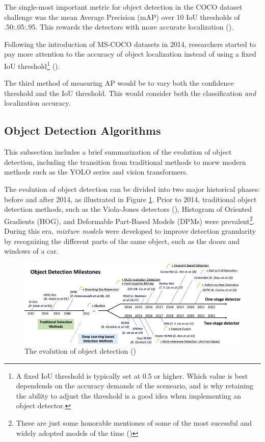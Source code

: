 The single-most important metric for object detection in the COCO dataset challenge was the mean Average Precision (mAP) over 10 IoU thresholds of .50:.05:.95. This rewards the detectors with more accurate localization (\cite{li2014cocodataset}).

Following the introduction of MS-COCO datasets in 2014, researchers started to pay more attention to the accuracy of object localization instead of using a fixed IoU threshold\footnote{A fixed IoU threshold is typically set at 0.5 or higher. Which value is best dependends on the accuracy demands of the sceneario, and is why retaining the ability to adjust the threshold is a good idea when implementing an object detector.} (\cite{zou2023object_detection_in_20_years}).

The third method of measuring AP would be to vary both the confidence threshold and the IoU threshold. This would consider both the classification \textit{and} localization accuracy.

\subsection{Object Detection Algorithms}
\label{sec:object_detection}
This subsection includes a brief summarization of the evolution of object detection, including the transition from traditional methods to morw modern methods such as the YOLO series and vision transformers.

The evolution of object detection can be divided into two major historical phases: before and after 2014, as illustrated in Figure \ref{fig:object_detect_20_years}. Prior to 2014, traditional object detection methods, such as the Viola-Jones detectors (\cite{vi2001viola-jones-orig}), Histogram of Oriented Gradients (HOG), and Deformable Part-Based Models (DPMs) were prevalent\footnote{These are just some honorable mentiones of some of the most sucessful and widely adopted models of the time (\cite{li2012violajonessuccessful})}. During this era, \textit{mixture models} were developed to improve detection granularity by recognizing the different parts of the same object, such as the doors and windows of a car.

\begin{figure}[H]
    \centering
    \includegraphics[width=1\linewidth]{Images/Diagrams/object_detection_20years.png}
    \caption{\centering The evolution of object detection (\cite{zou2023object_detection_in_20_years})}
    \label{fig:object_detect_20_years}
\end{figure}

